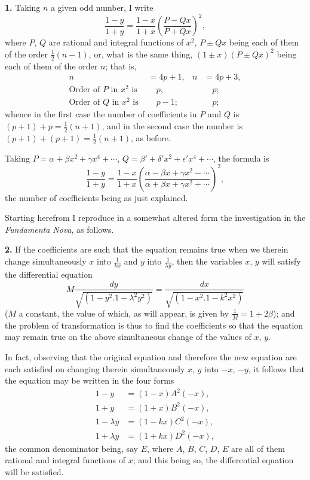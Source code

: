 \documentclass[11pt,a4paper]{book}
\begin{document}
\medskip
\noindent\textbf{1.} Taking $n$ a given odd number, I write
\[
\frac{1 - y}{1 + y} = \frac{1 - x}{1 + x}\left(\frac{P - Qx}{P + Qx}\right)^2,
\]
where $P$, $Q$ are rational and integral functions of $x^2$, $P \pm Qx$ being each of them of the order $\frac{1}{2}(n - 1)$, or, what is the same thing, $(1 \pm x)(P \pm Qx)^2$ being each of them of the order $n$; that is,
\begin{align*}
n &= 4p + 1, & n &= 4p + 3, \\
\text{Order of } P \text{ in } x^2 \text{ is } &\quad p, & &\quad p; \\
\text{Order of } Q \text{ in } x^2 \text{ is } &\quad p - 1; & &\quad p;
\end{align*}
whence in the first case the number of coefficients in $P$ and $Q$ is $(p + 1) + p = \frac{1}{2}(n + 1)$, and in the second case the number is $(p + 1) + (p + 1) = \frac{1}{2}(n + 1)$, as before.

Taking $P = \alpha + \beta x^2 + \gamma x^4 + \cdots$, $Q = \beta' + \delta' x^2 + \epsilon' x^4 + \cdots$, the formula is
\[
\frac{1 - y}{1 + y} = \frac{1 - x}{1 + x}\left(\frac{\alpha - \beta x + \gamma x^2 - \cdots}{\alpha + \beta x + \gamma x^2 + \cdots}\right)^2,
\]
the number of coefficients being as just explained.

Starting herefrom I reproduce in a somewhat altered form the investigation in the \textit{Fundamenta Nova}, as follows.

\medskip
\noindent\textbf{2.} If the coefficients are such that the equation remains true when we therein change simultaneously $x$ into $\frac{1}{kx}$ and $y$ into $\frac{1}{\lambda y}$, then the variables $x$, $y$ will satisfy the differential equation
\[
M\frac{dy}{\sqrt{(1 - y^2 . 1 - \lambda^2 y^2)}} = \frac{dx}{\sqrt{(1 - x^2 . 1 - k^2 x^2)}}
\]
($M$ a constant, the value of which, as will appear, is given by $\frac{1}{M} = 1 + 2\beta$); and the problem of transformation is thus to find the coefficients so that the equation may remain true on the above simultaneous change of the values of $x$, $y$.

In fact, observing that the original equation and therefore the new equation are each satisfied on changing therein simultaneously $x$, $y$ into $-x$, $-y$, it follows that the equation may be written in the four forms
\begin{align*}
1 - y &= (1 - x)A^2(-x), \\
1 + y &= (1 + x)B^2(-x), \\
1 - \lambda y &= (1 - kx)C^2(-x), \\
1 + \lambda y &= (1 + kx)D^2(-x),
\end{align*}
the common denominator being, say $E$, where $A$, $B$, $C$, $D$, $E$ are all of them rational and integral functions of $x$; and this being so, the differential equation will be satisfied.
\end{document}
